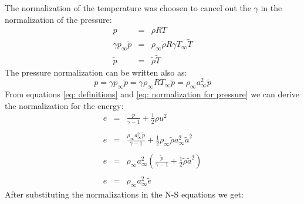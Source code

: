 \documentclass[11pt, a4paper]{article}
\begin{document}
\noindent The normalization of the temperature was choosen to cancel out the $\gamma$ in the normalization of the pressure:
\begin{equation}
    \begin{array}{lcl}
        p & = & \rho RT \\
        \gamma p_\infty\tilde{p} & = & \rho_\infty\tilde{\rho}R\gamma T_\infty\tilde{T} \\
        \tilde{p} & = & \tilde{\rho}\tilde{T}
    \end{array}
\end{equation}
The pressure normalization can be written also as:
\begin{equation}
    p=\gamma p_\infty\tilde{p}=\gamma\rho_\infty RT_\infty\tilde{p}=\rho_\infty a_\infty^2\tilde{p}
    \label{eq: normalization for pressure}
\end{equation}
From equations \ref{eq: definitions} and \ref{eq: normalization for pressure} we can derive the normalization for the energy:
\begin{equation}
    \begin{array}{lcl}
        e & = & \displaystyle\frac{p}{\gamma-1}+\frac{1}{2}\rho u^2 \\\\
        e & = & \displaystyle\frac{\rho_\infty a_\infty^2\tilde{p}}{\gamma-1}+\frac{1}{2}\rho_\infty\tilde{\rho}a_\infty^2\tilde{a}^2 \\\\
        e & = & \displaystyle \rho_\infty a_\infty^2\left(\frac{\tilde{p}}{\gamma-1}+\frac{1}{2}\tilde{\rho}\tilde{a}^2\right) \\\\
        e & = & \rho_\infty a_\infty^2\tilde{e}
    \end{array}
\end{equation}
After substituting the normalizations in the N-S equations we get:
\end{document}
